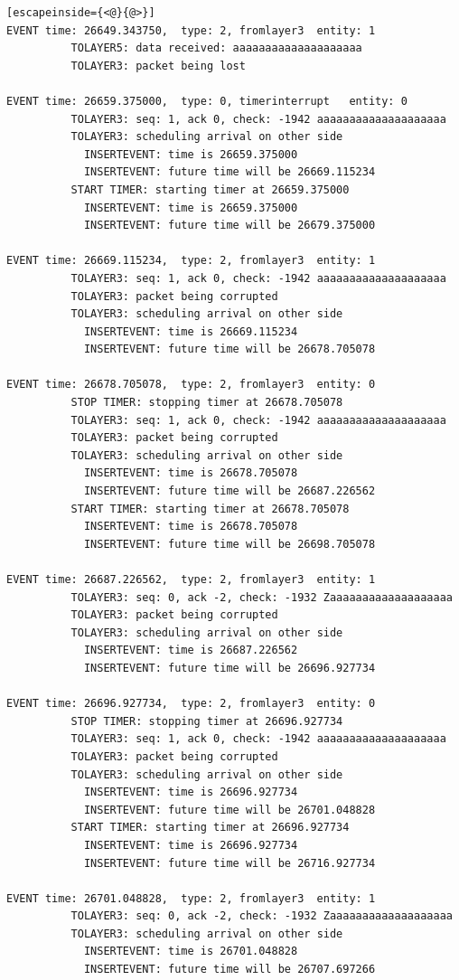 \documentclass[paper=a4, fontsize=11pt]{scrartcl}
\numberwithin{equation}{section}		%
\numberwithin{figure}{section}			%
\numberwithin{table}{section}				%
\begin{document}
\begin{lstlisting}[escapeinside={<@}{@>}]
EVENT time: 26649.343750,  type: 2, fromlayer3  entity: 1
          TOLAYER5: data received: aaaaaaaaaaaaaaaaaaaa
          TOLAYER3: packet being lost

EVENT time: 26659.375000,  type: 0, timerinterrupt   entity: 0
          TOLAYER3: seq: 1, ack 0, check: -1942 aaaaaaaaaaaaaaaaaaaa
          TOLAYER3: scheduling arrival on other side
            INSERTEVENT: time is 26659.375000
            INSERTEVENT: future time will be 26669.115234
          START TIMER: starting timer at 26659.375000
            INSERTEVENT: time is 26659.375000
            INSERTEVENT: future time will be 26679.375000

EVENT time: 26669.115234,  type: 2, fromlayer3  entity: 1
          TOLAYER3: seq: 1, ack 0, check: -1942 aaaaaaaaaaaaaaaaaaaa
          TOLAYER3: packet being corrupted
          TOLAYER3: scheduling arrival on other side
            INSERTEVENT: time is 26669.115234
            INSERTEVENT: future time will be 26678.705078

EVENT time: 26678.705078,  type: 2, fromlayer3  entity: 0
          STOP TIMER: stopping timer at 26678.705078
          TOLAYER3: seq: 1, ack 0, check: -1942 aaaaaaaaaaaaaaaaaaaa
          TOLAYER3: packet being corrupted
          TOLAYER3: scheduling arrival on other side
            INSERTEVENT: time is 26678.705078
            INSERTEVENT: future time will be 26687.226562
          START TIMER: starting timer at 26678.705078
            INSERTEVENT: time is 26678.705078
            INSERTEVENT: future time will be 26698.705078

EVENT time: 26687.226562,  type: 2, fromlayer3  entity: 1
          TOLAYER3: seq: 0, ack -2, check: -1932 Zaaaaaaaaaaaaaaaaaaa
          TOLAYER3: packet being corrupted
          TOLAYER3: scheduling arrival on other side
            INSERTEVENT: time is 26687.226562
            INSERTEVENT: future time will be 26696.927734

EVENT time: 26696.927734,  type: 2, fromlayer3  entity: 0
          STOP TIMER: stopping timer at 26696.927734
          TOLAYER3: seq: 1, ack 0, check: -1942 aaaaaaaaaaaaaaaaaaaa
          TOLAYER3: packet being corrupted
          TOLAYER3: scheduling arrival on other side
            INSERTEVENT: time is 26696.927734
            INSERTEVENT: future time will be 26701.048828
          START TIMER: starting timer at 26696.927734
            INSERTEVENT: time is 26696.927734
            INSERTEVENT: future time will be 26716.927734

EVENT time: 26701.048828,  type: 2, fromlayer3  entity: 1
          TOLAYER3: seq: 0, ack -2, check: -1932 Zaaaaaaaaaaaaaaaaaaa
          TOLAYER3: scheduling arrival on other side
            INSERTEVENT: time is 26701.048828
            INSERTEVENT: future time will be 26707.697266


\end{lstlisting}
\end{document}
